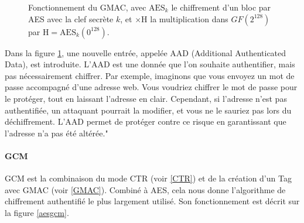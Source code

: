 \documentclass[a4paper, 12pt]{article}
\begin{document}
\begin{figure}[h]
\caption{Fonctionnement du GMAC, avec $\text{AES}_k$ le chiffrement d'un bloc par AES avec la clef secrète $k$, et $\times \text{H}$ la multiplication dans $GF\left(2^{128}\right)$ par $\text{H} = \text{AES}_k\left({0}^{128}\right)$.}
\label{gmac}
\end{figure}

Dans la figure \ref{gmac}, une nouvelle entrée, appelée AAD (Additional Authenticated Data), est introduite. L'AAD est une donnée que l'on souhaite authentifier, mais pas nécessairement chiffrer. Par exemple, imaginons que vous envoyez un mot de passe accompagné d'une adresse web. Vous voudriez chiffrer le mot de passe pour le protéger, tout en laissant l'adresse en clair. Cependant, si l'adresse n'est pas authentifiée, un attaquant pourrait la modifier, et vous ne le sauriez pas lors du déchiffrement. L'AAD permet de protéger contre ce risque en garantissant que l'adresse n'a pas été altérée."

\paragraph{GCM}

GCM est la combinaison du mode CTR (voir \ref{CTR}) et de la création d'un Tag avec GMAC (voir \ref{GMAC}). Combiné à AES, cela nous donne l'algorithme de chiffrement authentifié le plus largement utilisé. Son fonctionnement est décrit sur la figure \ref{aesgcm}.
\end{document}
